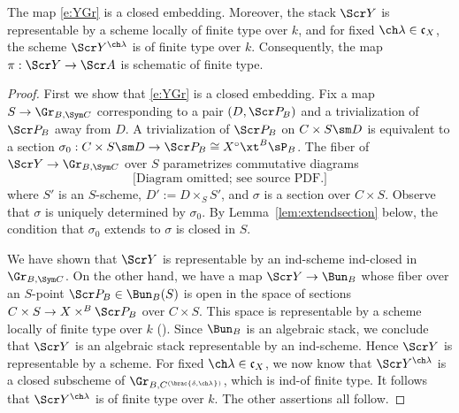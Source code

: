 \begin{prop}
\notready \label{prop:YGr}
The map \eqref{e:YGr} is a closed embedding.
Moreover, the stack $\Scr Y$ is representable by a scheme locally of finite type over $k$, and for fixed $\ch\lambda\in \mathfrak c_X$, the scheme
$\Scr Y^{\ch\lambda}$ is of finite type over $k$.
Consequently, the map $\pi : \Scr Y \to \Scr A$ is schematic of finite type.
\end{prop}
\begin{proof}
First we show that \eqref{e:YGr} is a closed embedding.
Fix a map $S \to \Gr_{B,\Sym C}$ corresponding to a pair
$(D,\Scr P_B)$ and a trivialization of $\Scr P_B$ away from $D$.
A trivialization of $\Scr P_B$ on $C\times S\sm D$ is equivalent to a section
$\sigma_0:C \times S\sm D \to \Scr P_B \cong X^\circ \xt^B \sP_B$.
The fiber of $\Scr Y \to \Gr_{B,\Sym C}$ over $S$
 parametrizes commutative diagrams
\[
\text{[Diagram omitted; see source PDF.]}
\]
where $S'$ is an $S$-scheme, $D':= D\times_S S'$, and $\sigma$ is a
section over $C\times S$.
Observe that $\sigma$ is uniquely determined by $\sigma_0$.
By Lemma~\ref{lem:extendsection} below, the condition that
$\sigma_0$ extends to $\sigma$ is closed in $S$.

We have shown that $\Scr Y$ is representable by an ind-scheme
ind-closed in $\Gr_{B,\Sym C}$. On the other hand, we have a map
$\Scr Y \to \Bun_B$ whose fiber over an $S$-point $\Scr P_B \in \Bun_B(S)$
is open in the space of sections $C\times S \to X \times^B \Scr P_B$ over $C\times S$.
This space is representable by a scheme locally of finite type over $k$ (\cite[Theorem 5.23]{FGA-explained}). Since $\Bun_B$ is an algebraic stack, we conclude that
$\Scr Y$ is an algebraic stack representable by an ind-scheme. Hence
$\Scr Y$ is representable by a scheme.
For fixed $\ch\lambda \in \mathfrak c_X$, we now know that $\Scr Y^{\ch\lambda}$ is a closed subscheme of $\Gr_{B,C^{(\brac{\delta,\ch\lambda})}}$, which is ind-of finite type. It follows that $\Scr Y^{\ch\lambda}$ is of finite type over $k$. The other assertions all follow.
\end{proof}

